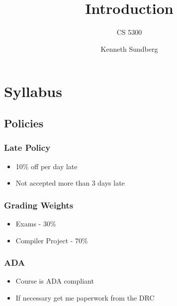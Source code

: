 \documentclass[usepdftitle=false,professionalfonts,compress ]{beamer}
\title{Introduction}
\subtitle{CS 5300}
\author{Kenneth Sundberg}
\date{}
\begin{document}
\frame[plain]{
	\frametitle{}
	\titlepage
	\vspace{-0.5cm}
	\begin{center}
	\end{center}
}
\frame{
	\tableofcontents[hideallsubsections]
}
















\section{Syllabus}
		
\subsection{Policies}

{
\begin{frame}\frametitle{Late Policy}

	\begin{itemize}
	\item 10\% off per day late
			\item Not accepted more than 3 days late
				\end{itemize}

\end{frame}}




{
\begin{frame}\frametitle{Grading Weights}

	\begin{itemize}
	\item Exams - 30\%
			\item Compiler Project - 70\%
				\end{itemize}

\end{frame}}




{
\begin{frame}\frametitle{ADA}

	\begin{itemize}
	\item Course is ADA compliant
			\item If necessary get me paperwork from the DRC
				\end{itemize}

\end{frame}}
\end{document}
